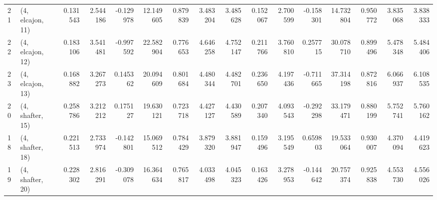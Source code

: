 \begin{tabular}{llrrrrrrrrrrrrrr}
21 &  (4, elcajon, 11) &   0.131543 &  2.544186 & -0.129978 &  12.149605 &  0.879839 &   3.483204 &  3.485628 &  0.152067 &  2.700599 & -0.158301 &   14.732804 &  0.950772 &   3.835068 &   3.838333 \\
22 &  (4, elcajon, 12) &   0.183106 &  3.541481 & -0.997592 &  22.582904 &  0.776653 &   4.646258 &  4.752147 &  0.211766 &  3.760810 &  0.257715 &   30.078710 &  0.899496 &   5.478348 &   5.484406 \\
23 &  (4, elcajon, 13) &   0.168882 &  3.267273 &  0.145362 &  20.094609 &  0.801684 &   4.480344 &  4.482701 &  0.236650 &  4.197436 & -0.711665 &   37.314198 &  0.872816 &   6.066937 &   6.108535 \\
20 &  (4, shafter, 15) &   0.258786 &  3.212212 &  0.175127 &  19.630121 &  0.723718 &   4.427127 &  4.430589 &  0.207340 &  4.093543 & -0.292298 &   33.179471 &  0.880199 &   5.752741 &   5.760162 \\
18 &  (4, shafter, 18) &   0.221513 &  2.733974 & -0.142801 &  15.069512 &  0.784429 &   3.879320 &  3.881947 &  0.159496 &  3.195549 &  0.659803 &   19.533064 &  0.930007 &   4.370094 &   4.419623 \\
19 &  (4, shafter, 20) &   0.228302 &  2.816291 & -0.309078 &  16.364634 &  0.765817 &   4.033498 &  4.045323 &  0.163426 &  3.278953 & -0.144642 &   20.757374 &  0.925838 &   4.553730 &   4.556026 \\
\bottomrule
\end{tabular}
